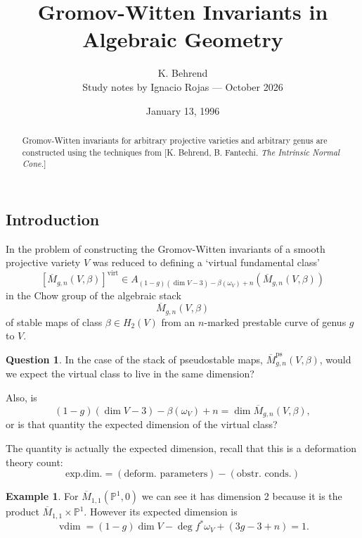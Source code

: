 \documentclass[11pt]{article}
\title{Gromov-Witten Invariants in Algebraic Geometry}
\author{K. Behrend\\[.65em]
  {\small Study notes by Ignacio Rojas --- October 2026}}
\newcommand{\ol}{\overline}
\newcommand{\virt}{\mathrm{virt}}
\theoremstyle{plain}
\theoremstyle{remark}
\newcommand{\x}{\times}
\newcommand{\ps}{\mathrm{ps}}
\newcommand{\bt}{\beta}
\newcommand{\om}{\omega}
\newcommand{\bP}{\mathbb{P}}
\DeclareMathOperator{\vdim}{vdim}
\newcommand{\red}[1]{\textcolor{red}{#1}}
\let\notesred\red
\theoremstyle{plain}
\theoremstyle{definition}
\newtheorem{Ex}[Th]{Example}
\newtheorem*{Qn}{Question}
\theoremstyle{remark}
\newcounter{passage}
\newcommand{\passagemark}{%
  \refstepcounter{passage}%
  \textsuperscript{\normalfont[\thepassage]}%
}
\begin{document}
\date{January 13, 1996}
\maketitle
\begin{abstract}
{Gromov-Witten invariants for arbitrary projective varieties
and arbitrary genus are constructed using the techniques from [K.
Behrend, B. Fantechi. {\em The Intrinsic Normal Cone.\/}]}
\end{abstract}






\subsection{Introduction}


In \cite{BM} the problem of constructing the Gromov-Witten invariants
of a smooth projective variety \(V\) was reduced to defining a `virtual
fundamental class'
\[
[\ol{M}_{g,n}(V,\beta)]^{\virt}\in A_{(1-g)(\dim
V-3)-\beta(\omega_V)+n}(\ol{M}_{g,n}(V,\beta))
\]
in the Chow group of the algebraic stack
\[
\ol{M}_{g,n}(V,\beta)
\]
of stable maps of class \(\beta\in H_2(V)\) from an \(n\)-marked prestable
curve of genus \(g\) to \(V\).

\begin{ptcb}
\begin{Qn}
  In the case of the stack of pseudostable maps, \(\ol{M}_{g,n}^{\ps}(V,\bt)\), \textquestiondown{}would we expect the virtual class to live in the same dimension?\par
  Also, \textquestiondown{}is
\[
(1-g)(\dim V-3)-\beta(\omega_V)+n=\dim \ol{M}_{g,n}(V,\beta),
\]
  or is that quantity the expected dimension of the virtual class?
\end{Qn}
\tcbline

The quantity is actually the expected dimension, recall that this is a deformation theory count: 
\[
\text{exp.dim.}=(\text{deform. parameters})-(\text{obstr. conds.})
\]

\begin{Ex}
For \(\ol{M}_{1,1}(\bP^1,0)\) we can see it has dimension 2 because it is the product \(\ol{M}_{1,1}\x\bP^1\). However its expected dimension is 
\[
\vdim = (1-g)\dim V-\deg f^\ast\om_V+(3g-3+n)=1.
\]
\end{Ex}
\end{ptcb}
\end{document}
